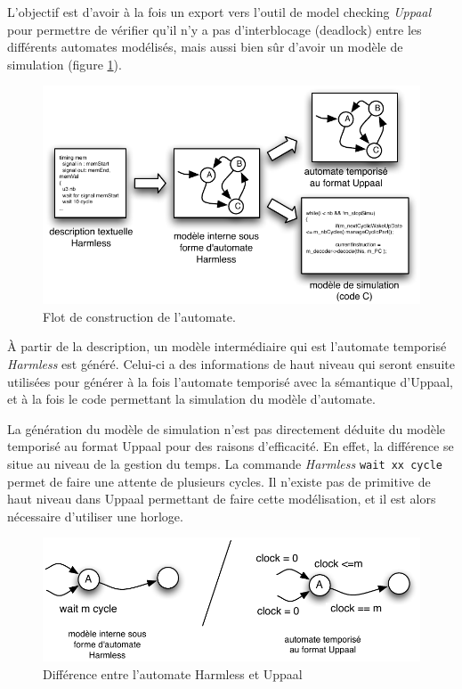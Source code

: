 \documentclass[11pt,a4paper]{article}
\begin{document}
L'objectif est d'avoir à la fois un export vers l'outil de model checking \emph{Uppaal} pour permettre de vérifier qu'il n'y a pas d'interblocage (deadlock) entre les différents automates modélisés, mais aussi bien sûr d'avoir un modèle de simulation (figure \ref{fig:automateFlotConstruction}).
\begin{figure}[htbp] %
   \centering
   \includegraphics[width=\linewidth]{automateFlotConstruction.pdf} 
   \caption{Flot de construction de l'automate.}
   \label{fig:automateFlotConstruction}
\end{figure}
À partir de la description, un modèle intermédiaire qui est l'automate temporisé \emph{Harmless} est généré. Celui-ci a des informations de haut niveau qui seront ensuite utilisées pour générer à la fois l'automate temporisé avec la sémantique d'Uppaal, et à la fois le code permettant la simulation du modèle d'automate. 

La génération du modèle de simulation n'est pas directement déduite du modèle temporisé au format Uppaal pour des raisons d'efficacité. En effet, la  différence se situe au niveau de la gestion du temps. La commande \emph{Harmless} \texttt{wait xx cycle} permet de faire une attente de plusieurs cycles. Il n'existe pas de primitive de haut niveau dans Uppaal permettant de faire cette modélisation, et il est alors nécessaire d'utiliser une horloge.

\begin{figure}[htbp] %
   \centering
   \includegraphics[width=\linewidth]{automateWaitCycleDiff.pdf} 
   \caption{Différence entre l'automate Harmless et Uppaal}
   \label{fig:automateWaitCycleDiff}
\end{figure}
\end{document}
